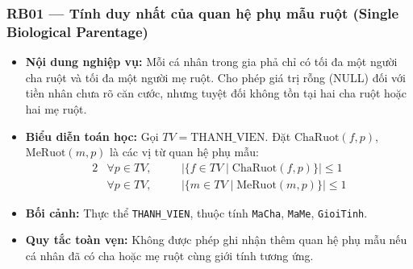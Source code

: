 \subsubsection{RB01 --- Tính duy nhất của quan hệ phụ mẫu ruột (Single Biological Parentage)}
\begin{itemize}
    \item \textbf{Nội dung nghiệp vụ:} Mỗi cá nhân trong gia phả chỉ có tối đa một người cha ruột và tối đa một người mẹ ruột. Cho phép giá trị rỗng (NULL) đối với tiền nhân chưa rõ căn cước, nhưng tuyệt đối không tồn tại hai cha ruột hoặc hai mẹ ruột.
    \item \textbf{Biểu diễn toán học:} Gọi $TV = \text{THANH\_VIEN}$. Đặt $\text{ChaRuot}(f, p)$, $\text{MeRuot}(m, p)$ là các vị từ quan hệ phụ mẫu:
    \begin{alignat}{2}
        &\forall p \in TV, \quad
        &&\big|\{ f \in TV \mid \text{ChaRuot}(f, p) \}\big| \le 1 \\[3pt]
        &\forall p \in TV, \quad
        &&\big|\{ m \in TV \mid \text{MeRuot}(m, p) \}\big| \le 1
    \end{alignat}
    \item \textbf{Bối cảnh:} Thực thể \texttt{THANH\_VIEN}, thuộc tính \texttt{MaCha}, \texttt{MaMe}, \texttt{GioiTinh}.
    \item \textbf{Quy tắc toàn vẹn:} Không được phép ghi nhận thêm quan hệ phụ mẫu nếu cá nhân đã có cha hoặc mẹ ruột cùng giới tính tương ứng.
\end{itemize}

